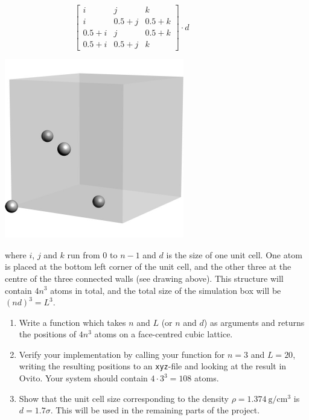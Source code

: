 \documentclass[11pt,british,a4paper]{report}
\begin{document}
\hspace{0.1\textwidth}
\begin{minipage}{0.4\textwidth}
    \centering
    \hfill
    \[
        \begin{bmatrix}
            i & j & k \\
            i & 0.5+j & 0.5+k \\
            0.5+i & j & 0.5+k \\
            0.5+i & 0.5+j & k
        \end{bmatrix}\cdot d\qquad \qquad\qquad
    \]
\end{minipage}
\begin{minipage}{0.4\textwidth}
    \centering
    \includegraphics{fig.pdf}
\end{minipage}

where \(i\), \(j\) and \(k\) run from \(0\) to \(n-1\) and \(d\) is the size of one unit cell. One atom is placed at the bottom left corner of the unit cell, and the other three at
the centre of the three connected walls (see drawing above). This structure will contain \(4n^3\) atoms in total, and the total size of the simulation box will be $(nd)^3=L^3$.


\begin{enumerate}[label=\roman*.]
    \item Write a function which takes \(n\) and \(L\) (or \(n\) and \(d\)) as arguments and returns the positions of \(4n^3\) atoms on a face-centred cubic lattice.
    \item Verify your implementation by calling your function for \(n=3\) and \(L = 20\), writing the resulting positions to an \texttt{xyz}-file and looking at the result in Ovito. Your system should contain \(4\cdot3^3=108\) atoms.
    \item Show that the unit cell size corresponding to the density \(\rho=\SI{1.374}{\gram\per\cm\tothe3}\) is \(d=1.7 \sigma\). This will be used in the remaining parts of the project.
\end{enumerate}
\end{document}
